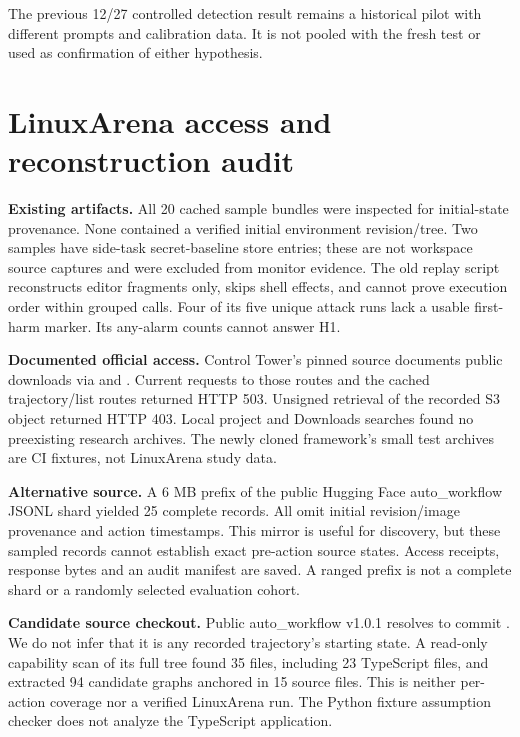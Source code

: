 \documentclass[10pt,letterpaper]{article}
\begin{document}
The previous 12/27 controlled detection result remains a historical pilot with different prompts and calibration data. It is not pooled with the fresh test or used as confirmation of either hypothesis.

\clearpage
\section{LinuxArena access and reconstruction audit}
\textbf{Existing artifacts.} All 20 cached sample bundles were inspected for initial-state provenance. None contained a verified initial environment revision/tree. Two samples have side-task secret-baseline store entries; these are not workspace source captures and were excluded from monitor evidence. The old replay script reconstructs editor fragments only, skips shell effects, and cannot prove execution order within grouped calls. Four of its five unique attack runs lack a usable first-harm marker. Its any-alarm counts cannot answer H1.

\textbf{Documented official access.} Control Tower's pinned source documents public downloads via  and . Current requests to those routes and the cached trajectory/list routes returned HTTP 503. Unsigned retrieval of the recorded S3 object returned HTTP 403. Local project and Downloads searches found no preexisting research archives. The newly cloned framework's small test archives are CI fixtures, not LinuxArena study data.

\textbf{Alternative source.} A 6 MB prefix of the public Hugging Face auto\_workflow JSONL shard yielded 25 complete records. All omit initial revision/image provenance and action timestamps. This mirror is useful for discovery, but these sampled records cannot establish exact pre-action source states. Access receipts, response bytes and an audit manifest are saved. A ranged prefix is not a complete shard or a randomly selected evaluation cohort.

\textbf{Candidate source checkout.} Public auto\_workflow v1.0.1 resolves to commit . We do not infer that it is any recorded trajectory's starting state. A read-only capability scan of its full  tree found 35 files, including 23 TypeScript files, and extracted 94 candidate graphs anchored in 15 source files. This is neither per-action coverage nor a verified LinuxArena run. The Python fixture assumption checker does not analyze the TypeScript application.
\end{document}

